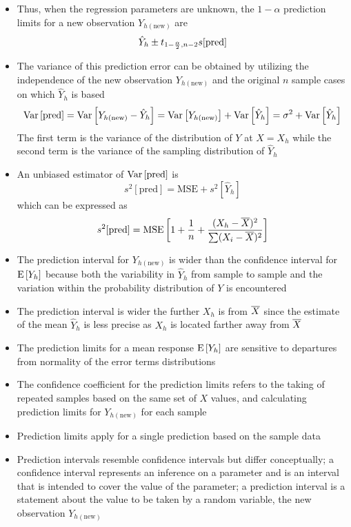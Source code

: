 \begin{itemize}
\item Thus, when the regression parameters are unknown, the $1-\alpha$ prediction limits for a new observation $Y_{h(\text{new})}$ are $$ \hat{Y}_h \pm t_{1 - \frac{\alpha}{2}, n-2} s[\text{pred}] $$ 
\item The variance of this prediction error can be obtained by utilizing the independence of the new observation $Y_{h(\text{new})}$ and the original $n$ sample cases on which $\hat{Y}_h$ is based 
$$ \mathrm{Var}\left[ \text{pred} \right] = \mathrm{Var}\left[ Y_{h(\text{new})} - \hat{Y}_h \right] = \mathrm{Var}\left[ Y_{h(\text{new})} \right] + \mathrm{Var}\left[ \hat{Y}_h \right] = \sigma^2 + \mathrm{Var}\left[ \hat{Y}_h \right] $$ The first term is the variance of the distribution of $Y$ at $X=X_h$ while the second term is the variance of the sampling distribution of $\hat{Y}_h$
\item An unbiased estimator of $\mathrm{Var}\left[ \text{pred} \right]$ is $$ s^2[\text{pred}] = \text{MSE} + s^2[\hat{Y}_h] $$ which can be expressed as 
$$ s^2[\text{pred}] = \text{MSE}\left[1 + \frac{1}{n} + \frac{(X_h - \overline{X})^2}{\sum (X_i - \overline{X})^2} \right] $$ 
\item The prediction interval for $Y_{h(\text{new})}$ is wider than the confidence interval for $\mathrm{E}\left[ Y_h \right]$ because both the variability in $\hat{Y}_h$ from sample to sample and the variation within the probability distribution of $Y$ is encountered
\item The prediction interval is wider the further $X_h$ is from $\overline{X}$ since the estimate of the mean $\hat{Y}_h$ is less precise as $X_h$ is located farther away from $\overline{X}$
\item The prediction limits for a mean response $\mathrm{E}\left[ Y_h \right]$ are sensitive to departures from normality of the error terms distributions
\item The confidence coefficient for the prediction limits refers to the taking of repeated samples based on the same set of $X$ values, and calculating prediction limits for $Y_{h(\text{new})}$ for each sample
\item Prediction limits apply for a single prediction based on the sample data
\item Prediction intervals resemble confidence intervals but differ conceptually; a confidence interval represents an inference on a parameter and is an interval that is intended to cover the value of the parameter; a prediction interval is a statement about the value to be taken by a random variable, the new observation $Y_{h(\text{new})}$

\end{itemize}
